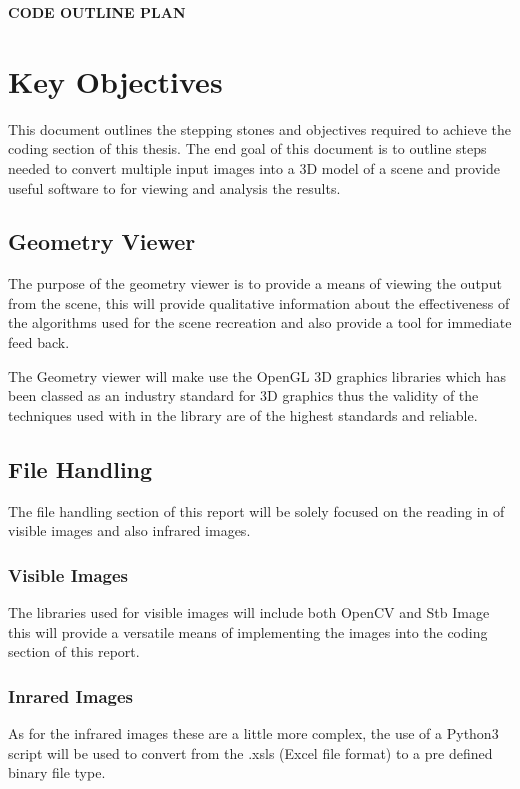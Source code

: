 \documentclass[11pt]{article}
\newcommand{\pe}{\vspace{0.5cm}}
\begin{document}
{\huge{\uppercase{\textbf{{Code Outline Plan}}}}}

	\section{Key Objectives} 
		This document outlines the stepping stones and objectives required to achieve the coding section of this thesis. The end goal of this document is to outline steps needed to convert multiple input images into a 3D model of a scene and provide useful software to for viewing and analysis the results.  

	\subsection{Geometry Viewer}
		The purpose of the geometry viewer is to provide a means of viewing the output from the scene, this will provide qualitative information about the effectiveness of the algorithms used for the scene recreation and also provide a tool for immediate feed back. 

		\pe 

		The Geometry viewer will make use the OpenGL 3D graphics libraries which has been classed as an industry standard for 3D graphics thus the validity of the techniques used with in the library are of the highest standards and reliable. 


	\subsection{File Handling}

		The file handling section of this report will  be solely focused on the reading in of visible images and also infrared images. 

		\subsubsection{Visible Images}

			The libraries used for visible images will include both OpenCV and Stb Image this will provide a versatile means of implementing the images into the coding section of this report.


		\subsubsection{Inrared Images}

			As for the infrared images these are a little more complex, the use of a Python3 script will be used to convert from the .xsls (Excel file format) to a pre defined binary file type. 
\end{document}
